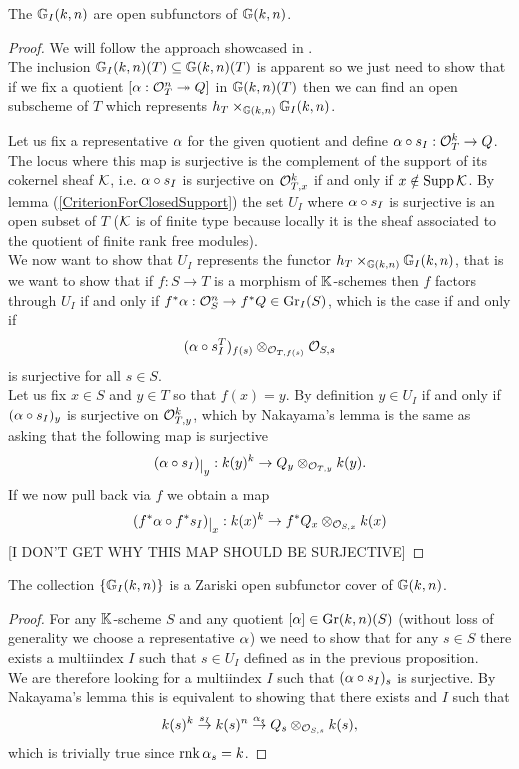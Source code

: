\begin{proposition}\label{GrIAreOpenSubfunctors}
The $\mathbb{G}_I(k,n)$ are open subfunctors of $\mathbb{G}(k,n)$.
\end{proposition}
\begin{proof}
We will follow the approach showcased in \cite{Bejleri2}.\\
The inclusion $\mathbb{G}_I(k,n)(T)\subseteq \mathbb{G}(k,n)(T)$ is apparent so we just need to show that if we fix a quotient $[\alpha:\mathcal{O}_T^n\twoheadrightarrow Q]$ in $\mathbb{G}(k,n)(T)$ then we can find an open subscheme of $T$ which represents $h_T\times_{\mathbb{G}(k,n)}\mathbb{G}_I(k,n)$.\medskip

\noindent Let us fix a representative $\alpha$ for the given quotient and define $\alpha\circ s_I:\mathcal{O}_T^k\to Q$. The locus where this map is surjective is the complement of the support of its cokernel sheaf $\mathcal{K}$, i.e. $\alpha\circ s_I$ is surjective on $\mathcal{O}_{T,x}^k$ if and only if $x\notin \mathrm{Supp}\,\mathcal{K}$. By lemma (\ref{CriterionForClosedSupport}) the set $U_I$ where $\alpha\circ s_I$ is surjective is an open subset of $T$ ($\mathcal{K}$ is of finite type because locally it is the sheaf associated to the quotient of finite rank free modules).\\
We now want to show that $U_I$ represents the functor $h_T\times_{\mathbb{G}(k,n)}\mathbb{G}_I(k,n)$, that is we want to show that if $f:S\to T$ is a morphism of $\mathbb{K}$-schemes then $f$ factors through $U_I$ if and only if $f^\ast\alpha:\mathcal{O}_S^n\to f^\ast Q \in \mathrm{Gr}_I(S)$, which is the case if and only if \[(\alpha\circ s_I^T)_{f(s)}\otimes_{\mathcal{O}_{T,f(s)}}\mathcal{O}_{S,s}\]
is surjective for all $s\in S$.\\ 
Let us fix $x\in S$ and $y\in T$ so that $f(x)=y$. By definition $y\in U_I$ if and only if $(\alpha\circ s_I)_y$ is surjective on $\mathcal{O}_{T,y}^k$, which by Nakayama's lemma is the same as asking that the following map is surjective
\[(\al\circ s_I)\res{y}:k(y)^k\to Q_y\otimes_{\Oc_{T,y}} k(y).\]
If we now pull back via $f$ we obtain a map
\[(f^\ast \al\circ f^\ast s_I)\res{x}:k(x)^k\to f^\ast Q_x\otimes_{\Oc_{S,x}} k(x)\]
[I DON'T GET WHY THIS MAP SHOULD BE SURJECTIVE]

\end{proof}


\begin{proposition}\label{GrIAreOpenCover}
The collection $\left\{{\mathbb{G}_I(k,n)}\right\}$ is a Zariski open subfunctor cover of $\mathbb{G}(k,n)$.
\end{proposition}
\begin{proof}
For any $\mathbb{K}$-scheme $S$ and any quotient $[\alpha]\in \mathrm{Gr}(k,n)(S)$ (without loss of generality we choose a representative $\alpha$) we need to show that for any $s\in S$ there exists a multiindex $I$ such that $s\in U_I$ defined as in the previous proposition.\\
We are therefore looking for a multiindex $I$ such that $(\alpha\circ s_I)_s$ is surjective. By Nakayama's lemma this is equivalent to showing that there exists and $I$ such that
\[k(s)^k\overset{s_I}\to k(s)^n\overset{\alpha_s}\to Q_s\otimes_{\mathcal{O}_{S,s}}k(s),\]
which is trivially true since $\mathrm{rnk}\, \alpha_s=k$.
\end{proof}


